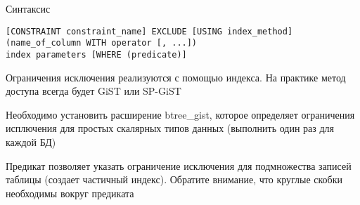\documentclass[12pt]{article}
\begin{document}
\begin{Remark}{Синтаксис}
\begin{lstlisting}
[CONSTRAINT constraint_name] EXCLUDE [USING index_method]
(name_of_column WITH operator [, ...])
index parameters [WHERE (predicate)]
\end{lstlisting}

    Ограничения исключения реализуются с помощью индекса. На практике метод доступа всегда будет GiST или SP-GiST 

    Необходимо установить расширение btree\_gist, которое определяет ограничения исплючения для простых скалярных типов данных (выполнить один раз для каждой БД)

    Предикат позволяет указать ограничение исключения для подмножества записей таблицы (создает частичный индекс). Обратите внимание, что круглые скобки необходимы вокруг предиката 
\end{Remark}
\end{document}
